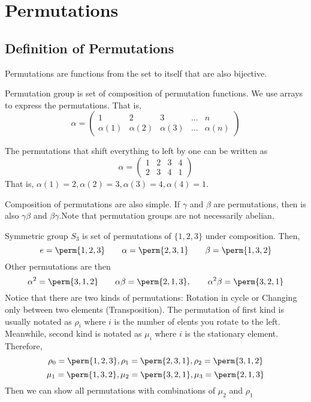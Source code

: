 \chapter{Permutations}
\section{Definition of Permutations}
\begin{definition*}
    \alert{Permutations} are functions from the set to itself that are also bijective.
\end{definition*}
\alert{Permutation group} is set of composition of permutation functions.
We use arrays to express the permutations. That is,
\[ \alpha =
    \begin{pmatrix}
        1 & 2 & 3 & ... & n \\
        \alpha(1) & \alpha(2) & \alpha(3) & ... & \alpha(n)
    \end{pmatrix}
\]
\begin{example}
    The permutations that shift everything to left by one can be written as
    \[
        \alpha =
        \begin{pmatrix}
            1 & 2& 3 & 4 \\
            2 & 3 & 4 & 1
        \end{pmatrix}
    \]
    That is, $\alpha(1) = 2, \alpha(2) = 3, \alpha(3) = 4, \alpha(4) = 1$.
\end{example}
Composition of permutations are also simple. If $\gamma$ and $\beta$ are permutations, then is also $\gamma \beta$ and $\beta \gamma$.Note
that permutation groups are \alert{not necessarily abelian}.

\begin{example}
    Symmetric group $S_3$ is set of permutations of $\{ 1,2,3\}$ under composition. Then,
    \[ e = \perm{1,2,3}
        \qquad
        \alpha = \perm{2,3,1}
        \qquad
        \beta = \perm{1,3,2}
    \]
    Other permutations are then
    \[ \alpha ^2 = \perm{3,1,2}
        \qquad
        \alpha \beta = \perm{2,1,3},
        \qquad
        \alpha^2 \beta = \perm{3,2,1}
    \]
    Notice that there are two kinds of permutations: Rotation in cycle or Changing only between two elements (Transposition). The
    permutation of first kind is usually notated as $\rho_i$ where $i$ is the number of elents you rotate to the left. Meanwhile, second
    kind is notated as $\mu_i$ where $i$ is the stationary element.
    Therefore,
    \[ \rho_0 = \perm{1,2,3}, \rho_1 = \perm{2,3,1}, \rho_2 = \perm{3,1,2}\]
    \[ \mu_1 = \perm{1,3,2}, \mu_2 = \perm{3,2,1}, \mu_3 = \perm{2,1,3}\]
    Then we can show all permutations with combinations of $\mu_2$ and $\rho_1$
\end{example}
